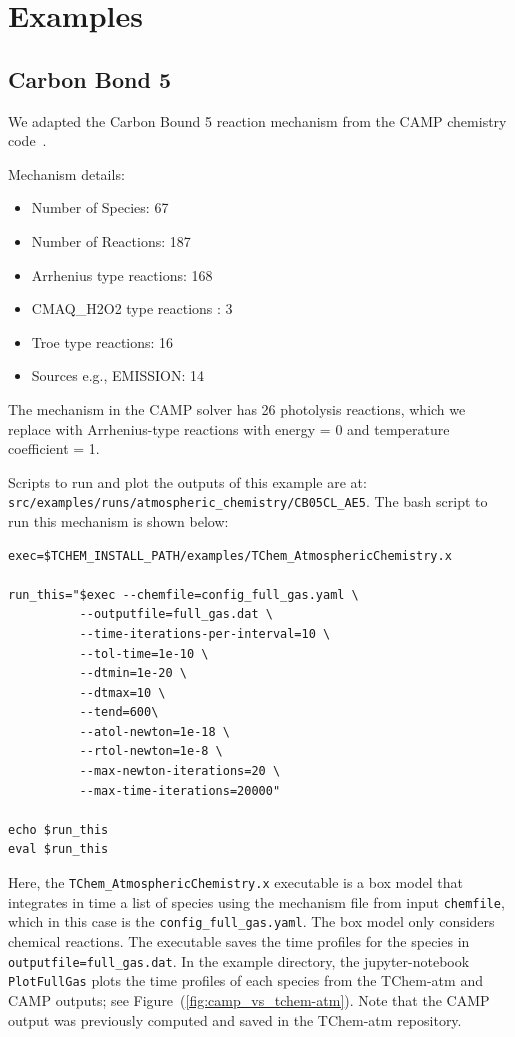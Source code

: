 \documentclass[report, 12pt]{SANDreport}
\begin{document}
\chapter{Examples}
\section{Carbon Bond 5}

We adapted the Carbon Bound 5 reaction mechanism from the CAMP chemistry code~\cite{campweb,Dawson2022}.

Mechanism details:

\begin{itemize}
\item Number of Species: 67
\item Number of Reactions: 187
\item Arrhenius type reactions: 168
\item CMAQ\_H2O2 type reactions : 3
\item Troe type reactions: 16
\item Sources e.g., EMISSION: 14
\end{itemize}

The mechanism in the CAMP solver has 26 photolysis reactions, which we replace with Arrhenius-type reactions with energy = 0  and temperature coefficient = 1.

Scripts to run and plot the outputs of this example are at: \verb|src/examples/runs/atmospheric_chemistry/CB05CL_AE5|. The bash script to run this mechanism is shown below:


\begin{verbatim}
exec=$TCHEM_INSTALL_PATH/examples/TChem_AtmosphericChemistry.x

run_this="$exec --chemfile=config_full_gas.yaml \
          --outputfile=full_gas.dat \
          --time-iterations-per-interval=10 \
          --tol-time=1e-10 \
          --dtmin=1e-20 \
          --dtmax=10 \
          --tend=600\
          --atol-newton=1e-18 \
          --rtol-newton=1e-8 \
          --max-newton-iterations=20 \
          --max-time-iterations=20000"

echo $run_this
eval $run_this
\end{verbatim}

Here, the \verb|TChem_AtmosphericChemistry.x| executable is a box model that integrates in time a list of species using the mechanism file from input \verb|chemfile|, which in this case is the \verb|config_full_gas.yaml|. The box model only considers chemical reactions. The executable saves the time profiles for the species in \verb|outputfile=full_gas.dat|. In the example directory, the jupyter-notebook \verb|PlotFullGas| plots the time profiles of each species from the TChem-atm and CAMP outputs; see Figure~(\ref{fig:camp_vs_tchem-atm}). Note that the CAMP output was previously computed and saved in the TChem-atm repository.
\end{document}

